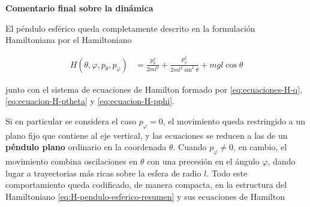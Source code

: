 \documentclass{article}
\begin{document}
\vspace{0.4cm}
\textbf{Comentario final sobre la dinámica}

El péndulo esférico queda completamente descrito en la formulación Hamiltoniana por
el Hamiltoniano

\begin{equation}
\begin{split}
H(\theta,\varphi,p_{\theta},p_{\varphi})
&= \frac{p_{\theta}^{2}}{2 m l^{2}}
 + \frac{p_{\varphi}^{2}}{2 m l^{2}\sin^{2}\theta}
 + m g l\cos\theta
\end{split}\label{eq:H-pendulo-esferico-resumen}
\end{equation}

junto con el sistema de ecuaciones de Hamilton formado por
\eqref{eq:ecuaciones-H-q}, \eqref{eq:ecuacion-H-ptheta} y
\eqref{eq:ecuacion-H-pphi}.  

Si en particular se considera el caso \(p_{\varphi}=0\), el movimiento queda
restringido a un plano fijo que contiene al eje vertical, y las ecuaciones se
reducen a las de un \textbf{péndulo plano} ordinario en la coordenada \(\theta\).  
Cuando \(p_{\varphi}\neq 0\), en cambio, el movimiento combina oscilaciones en
\(\theta\) con una precesión en el ángulo \(\varphi\), dando lugar a trayectorias
más ricas sobre la esfera de radio \(l\).  
Todo este comportamiento queda codificado, de manera compacta, en la estructura
del Hamiltoniano \eqref{eq:H-pendulo-esferico-resumen} y sus ecuaciones de Hamilton
\end{document}
